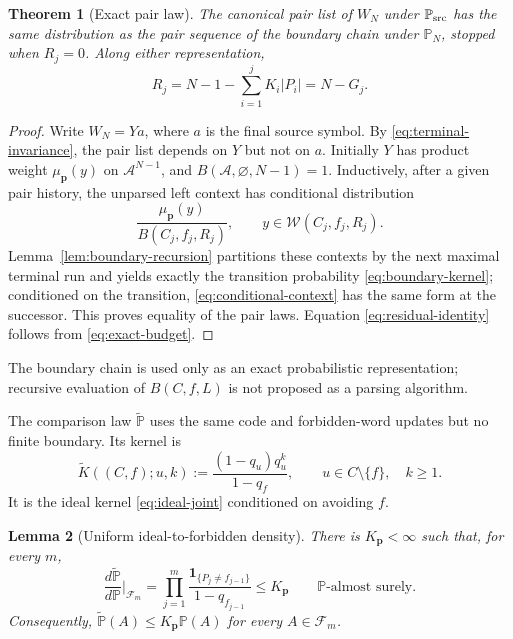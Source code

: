\documentclass[journal]{IEEEtran}
\theoremstyle{plain}
\newtheorem{theorem}{Theorem}[section]
\newtheorem{lemma}[theorem]{Lemma}
\theoremstyle{definition}
\theoremstyle{remark}
\newcommand{\A}{\mathcal A}
\newcommand{\F}{\mathcal F}
\newcommand{\Wcal}{\mathscr W}
\newcommand{\Psrc}{\mathbb P_{\rm src}}
\newcommand{\Pideal}{\mathbb P}
\newcommand{\Pforb}{\widetilde{\mathbb P}}
\newcommand{\Pbound}{\mathbb P_N}
\newcommand{\muP}{\mu_{\mathbf p}}
\newcommand{\one}{\mathbf 1}
\begin{document}
\begin{theorem}[Exact pair law]\label{thm:exact-pair-law}
The canonical pair list of $W_N$ under $\Psrc$ has the same distribution as the pair sequence of the boundary chain under $\Pbound$, stopped when $R_j=0$.  Along either representation,
\begin{equation}\label{eq:residual-identity}
 R_j=N-1-\sum_{i=1}^jK_i|P_i|=N-G_j.
\end{equation}
\end{theorem}

\begin{proof}
Write $W_N=Ya$, where $a$ is the final source symbol.  By \eqref{eq:terminal-invariance}, the pair list depends on $Y$ but not on $a$.  Initially $Y$ has product weight $\muP(y)$ on $\A^{N-1}$, and $B(\A,\varnothing,N-1)=1$.  Inductively, after a given pair history, the unparsed left context has conditional distribution
\begin{equation}\label{eq:conditional-context}
 \frac{\muP(y)}{B(C_j,f_j,R_j)},
 \qquad y\in\Wcal(C_j,f_j,R_j).
\end{equation}
Lemma~\ref{lem:boundary-recursion} partitions these contexts by the next maximal terminal run and yields exactly the transition probability \eqref{eq:boundary-kernel}; conditioned on the transition, \eqref{eq:conditional-context} has the same form at the successor.  This proves equality of the pair laws.  Equation \eqref{eq:residual-identity} follows from \eqref{eq:exact-budget}.
\end{proof}

The boundary chain is used only as an exact probabilistic representation; recursive evaluation of $B(C,f,L)$ is not proposed as a parsing algorithm.

The comparison law $\Pforb$ uses the same code and forbidden-word updates but no finite boundary.  Its kernel is
\begin{equation}\label{eq:forbidden-kernel}
 \widetilde K((C,f);u,k)
 :=\frac{(1-q_u)q_u^k}{1-q_f},
 \qquad u\in C\setminus\{f\},\quad k\ge1.
\end{equation}
It is the ideal kernel \eqref{eq:ideal-joint} conditioned on avoiding $f$.

\begin{lemma}[Uniform ideal-to-forbidden density]\label{lem:forbidden-density}
There is $K_{\mathbf p}<\infty$ such that, for every $m$,
\begin{equation}\label{eq:forbidden-density}
 \frac{d\Pforb}{d\Pideal}\bigg|_{\F_m}
 =\prod_{j=1}^m
 \frac{\one_{\{P_j\ne f_{j-1}\}}}{1-q_{f_{j-1}}}
 \le K_{\mathbf p}
 \qquad\Pideal\text{-almost surely}.
\end{equation}
Consequently, $\Pforb(A)\le K_{\mathbf p}\Pideal(A)$ for every $A\in\F_m$.
\end{lemma}
\end{document}
